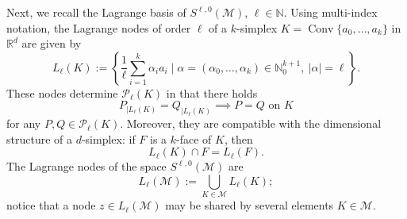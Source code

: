 \documentclass[a4paper]{amsart}
\numberwithin{equation}{section}
\theoremstyle{plain}
\theoremstyle{definition}
\begin{document}
\medskip Next, we recall the Lagrange basis of ${S}^{{\ell},0}({\mathcal{M}})$, 
${\ell}\in{\mathbb{N}}$.  Using multi-index notation, the Lagrange nodes of order ${\ell}$ 
of a $k$-simplex ${K}=\operatorname{Conv}\{a_0,\dots,a_k\}$ in ${{\mathbb{R}}^d}$ are given by
\[
 {L_{{\ell}}}({K})
 {:=}
 \left\{
  \frac1{\ell} \sum_{i=1}^k \alpha_i a_i \mid
   \alpha=(\alpha_0,\dots,\alpha_k)\in{\mathbb{N}}_0^{k+1}, \
   {|{{\alpha}}|}={\ell}
  \right\}.
\]
These nodes determine ${\mathcal{P}_{{\ell}}({{K}})}$ in that there holds
\[
 P_{|{L_{{\ell}}}({K})}=Q_{|{L_{{\ell}}}({K})}
\implies
 P=Q \text{ on }{K}
\]
for any $P,Q\in{\mathcal{P}_{{\ell}}({{K}})}$.  Moreover, they are compatible with the 
dimensional structure of a $d$-simplex: if ${F}$ is a $k$-face of ${K}$, 
then
\begin{equation}
\label{LagrangeCompatability}
 {L_{{\ell}}}({K})\cap{F}={L_{{\ell}}}({F}).
\end{equation}
The Lagrange nodes of the space ${S}^{{\ell},0}({\mathcal{M}})$ are
\[
 {L_{{\ell}}}({\mathcal{M}})
 {:=}
 \bigcup_{{K}\in{\mathcal{M}}} {L_{{\ell}}}({K});
\]
notice that a node $z\in{L_{{\ell}}}({\mathcal{M}})$ may be shared by
several elements $K\in{\mathcal{M}}$.
\end{document}
